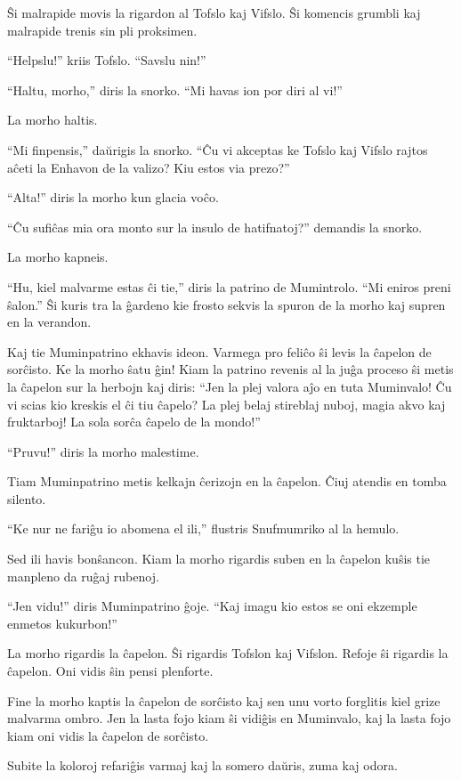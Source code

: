 Ŝi malrapide movis la rigardon al Tofslo kaj Vifslo. Ŝi komencis grumbli kaj malrapide trenis sin pli proksimen.

``Helpslu!'' kriis Tofslo. ``Savslu nin!''

``Haltu, morho,'' diris la snorko. ``Mi havas ion por diri al vi!''

La morho haltis.

``Mi finpensis,'' daŭrigis la snorko. ``Ĉu vi akceptas ke Tofslo kaj Vifslo rajtos aĉeti la Enhavon de la valizo? Kiu estos via prezo?''

``Alta!'' diris la morho kun glacia voĉo.

``Ĉu sufiĉas mia ora monto sur la insulo de hatifnatoj?'' demandis la snorko.

La morho kapneis.

``Hu, kiel malvarme estas ĉi tie,'' diris la patrino de Mumintrolo. ``Mi eniros preni ŝalon.'' Ŝi kuris tra la ĝardeno kie frosto sekvis la spuron de la morho kaj supren en la verandon.

Kaj tie Muminpatrino ekhavis ideon. Varmega pro feliĉo ŝi levis la ĉapelon de sorĉisto. Ke la morho ŝatu ĝin! Kiam la patrino revenis al la juĝa proceso ŝi metis la ĉapelon sur la herbojn kaj diris: ``Jen la plej valora aĵo en tuta Muminvalo! Ĉu vi scias kio kreskis el ĉi tiu ĉapelo? La plej belaj stireblaj nuboj, magia akvo kaj fruktarboj! La sola sorĉa ĉapelo de la mondo!''

``Pruvu!'' diris la morho malestime.

Tiam Muminpatrino metis kelkajn ĉerizojn en la ĉapelon. Ĉiuj atendis en tomba silento.

``Ke nur ne fariĝu io abomena el ili,'' flustris Snufmumriko al la hemulo.

Sed ili havis bonŝancon. Kiam la morho rigardis suben en la ĉapelon kuŝis tie manpleno da ruĝaj rubenoj.

``Jen vidu!'' diris Muminpatrino ĝoje. ``Kaj imagu kio estos se oni ekzemple enmetos kukurbon!''

La morho rigardis la ĉapelon. Ŝi rigardis Tofslon kaj Vifslon. Refoje ŝi rigardis la ĉapelon. Oni vidis ŝin pensi plenforte.

Fine la morho kaptis la ĉapelon de sorĉisto kaj sen unu vorto forglitis kiel grize malvarma ombro. Jen la lasta fojo kiam ŝi vidiĝis en Muminvalo, kaj la lasta fojo kiam oni vidis la ĉapelon de sorĉisto.

Subite la koloroj refariĝis varmaj kaj la somero daŭris, zuma kaj odora.


